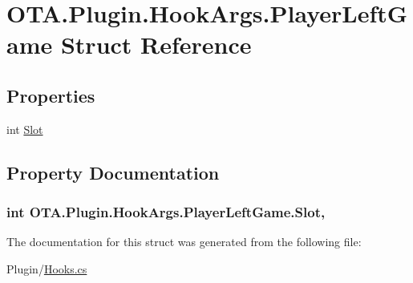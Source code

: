\hypertarget{struct_o_t_a_1_1_plugin_1_1_hook_args_1_1_player_left_game}{}\section{O\+T\+A.\+Plugin.\+Hook\+Args.\+Player\+Left\+Game Struct Reference}
\label{struct_o_t_a_1_1_plugin_1_1_hook_args_1_1_player_left_game}
\subsection*{Properties}
\begin{DoxyCompactItemize}
\item 
int \hyperlink{struct_o_t_a_1_1_plugin_1_1_hook_args_1_1_player_left_game_a3416d4ac2a4eb2947ea3fb21e7d6bc9d}{Slot}
\end{DoxyCompactItemize}


\subsection{Property Documentation}
\hypertarget{struct_o_t_a_1_1_plugin_1_1_hook_args_1_1_player_left_game_a3416d4ac2a4eb2947ea3fb21e7d6bc9d}{}
\subsubsection[{Slot}]{\setlength{\rightskip}{0pt plus 5cm}int O\+T\+A.\+Plugin.\+Hook\+Args.\+Player\+Left\+Game.\+Slot\hspace{0.3cm}{\ttfamily [get]}, {\ttfamily [set]}}\label{struct_o_t_a_1_1_plugin_1_1_hook_args_1_1_player_left_game_a3416d4ac2a4eb2947ea3fb21e7d6bc9d}


The documentation for this struct was generated from the following file\+:\begin{DoxyCompactItemize}
\item 
Plugin/\hyperlink{_hooks_8cs}{Hooks.\+cs}\end{DoxyCompactItemize}
